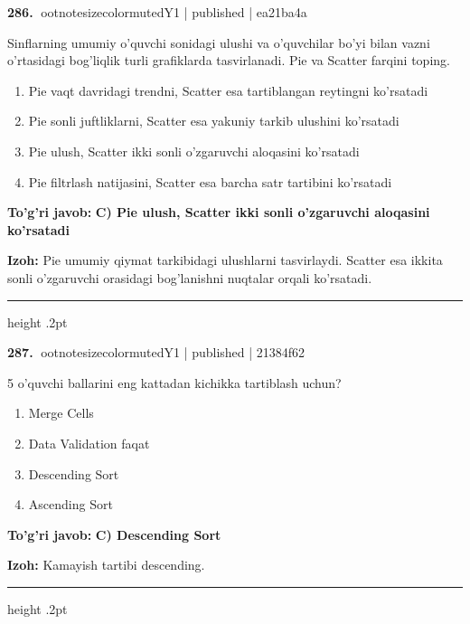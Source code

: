 \documentclass[10pt,a4paper]{article}
\begin{document}
\textbf{\color{ink}286.} {ootnotesizecolor{muted}Y1 | published | ea21ba4a}
\par
Sinflarning umumiy o'quvchi sonidagi ulushi va o'quvchilar bo'yi bilan vazni o'rtasidagi bog'liqlik turli grafiklarda tasvirlanadi. Pie va Scatter farqini toping.
\begin{enumerate}[label=\Alph*),leftmargin=9mm]
\item Pie vaqt davridagi trendni, Scatter esa tartiblangan reytingni ko'rsatadi
\item Pie sonli juftliklarni, Scatter esa yakuniy tarkib ulushini ko'rsatadi
\item Pie ulush, Scatter ikki sonli o'zgaruvchi aloqasini ko'rsatadi
\item Pie filtrlash natijasini, Scatter esa barcha satr tartibini ko'rsatadi
\end{enumerate}
\begin{tcolorbox}[enhanced,breakable,colback=teal!4,colframe=teal!55!black,boxrule=0.45pt,arc=1.2mm,left=2.8mm,right=2.8mm,top=2mm,bottom=2mm]
\textbf{\color{teal}To'g'ri javob:} \textbf{C) Pie ulush, Scatter ikki sonli o'zgaruvchi aloqasini ko'rsatadi}
\par\smallskip
\textbf{Izoh:} Pie umumiy qiymat tarkibidagi ulushlarni tasvirlaydi. Scatter esa ikkita sonli o'zgaruvchi orasidagi bog'lanishni nuqtalar orqali ko'rsatadi.
\end{tcolorbox}
\vspace{2mm}\hrule height .2pt\vspace{2mm}

\textbf{\color{ink}287.} {ootnotesizecolor{muted}Y1 | published | 21384f62}
\par
5 o'quvchi ballarini eng kattadan kichikka tartiblash uchun?
\begin{enumerate}[label=\Alph*),leftmargin=9mm]
\item Merge Cells
\item Data Validation faqat
\item Descending Sort
\item Ascending Sort
\end{enumerate}
\begin{tcolorbox}[enhanced,breakable,colback=teal!4,colframe=teal!55!black,boxrule=0.45pt,arc=1.2mm,left=2.8mm,right=2.8mm,top=2mm,bottom=2mm]
\textbf{\color{teal}To'g'ri javob:} \textbf{C) Descending Sort}
\par\smallskip
\textbf{Izoh:} Kamayish tartibi descending.
\end{tcolorbox}
\vspace{2mm}\hrule height .2pt\vspace{2mm}
\end{document}
